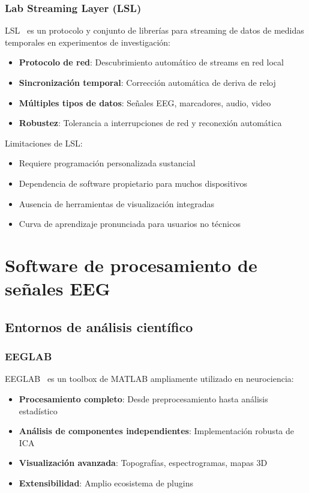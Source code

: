 \subsubsection{Lab Streaming Layer (LSL)}
LSL~\cite{lsl} es un protocolo y conjunto de librerías para streaming de datos de medidas temporales en experimentos de investigación:

\begin{itemize}
    \item \textbf{Protocolo de red}: Descubrimiento automático de streams en red local
    \item \textbf{Sincronización temporal}: Corrección automática de deriva de reloj
    \item \textbf{Múltiples tipos de datos}: Señales EEG, marcadores, audio, video
    \item \textbf{Robustez}: Tolerancia a interrupciones de red y reconexión automática
\end{itemize}

Limitaciones de LSL:
\begin{itemize}
    \item Requiere programación personalizada sustancial
    \item Dependencia de software propietario para muchos dispositivos
    \item Ausencia de herramientas de visualización integradas
    \item Curva de aprendizaje pronunciada para usuarios no técnicos
\end{itemize}

\section{Software de procesamiento de señales EEG}
\label{sec:software_procesamiento}

\subsection{Entornos de análisis científico}
\label{subsec:entornos_analisis}

\subsubsection{EEGLAB}
EEGLAB~\cite{eeglab} es un toolbox de MATLAB ampliamente utilizado en neurociencia:

\begin{itemize}
    \item \textbf{Procesamiento completo}: Desde preprocesamiento hasta análisis estadístico
    \item \textbf{Análisis de componentes independientes}: Implementación robusta de ICA
    \item \textbf{Visualización avanzada}: Topografías, espectrogramas, mapas 3D
    \item \textbf{Extensibilidad}: Amplio ecosistema de plugins
\end{itemize}

